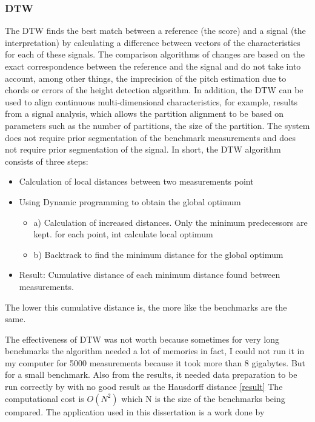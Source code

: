 \documentclass[12pt,a4paper]{article}
\begin{document}
\subsubsection{DTW}

 The DTW finds the best match between a reference (the score) and a signal (the interpretation) by calculating a difference between vectors of the characteristics for each of these signals. The comparison algorithms of changes are based on the exact correspondence between the reference and the signal and do not take into account, among other things, the imprecision of the pitch estimation due to chords or errors of the height detection algorithm. In addition, the DTW can be used to align continuous multi-dimensional characteristics, for example, results from a signal analysis, which allows the partition alignment to be based on parameters such as the number of partitions, the size of the partition.
The system does not require prior segmentation of the benchmark measurements and does not require prior segmentation of the
signal.
In short, the DTW algorithm consists of three steps:

\begin{itemize}
    \item Calculation of local distances between two measurements point
    \item Using Dynamic programming to obtain the global optimum \begin{itemize}
        \item a) Calculation of increased distances. Only the minimum predecessors are kept. for each point, int calculate local optimum
        \item b) Backtrack to find the minimum distance for the global optimum
    \end{itemize}
    \item Result: Cumulative distance of each minimum distance found between measurements.
\end{itemize}

The lower this cumulative distance is, the more like the benchmarks are the same.

The effectiveness of DTW was not worth because sometimes for very long benchmarks the algorithm needed a lot of memories in fact, I could not run it in my computer for 5000 measurements because it took more than 8 gigabytes. But for a small benchmark.
Also from the results, it needed data preparation to be run correctly by with no good result as the Hausdorff distance \ref{result}
The computational cost is $O(N^2)$ which N is the size of the benchmarks being compared.
The application used in this dissertation is a work done by \citep{salvador2007toward}
\end{document}
